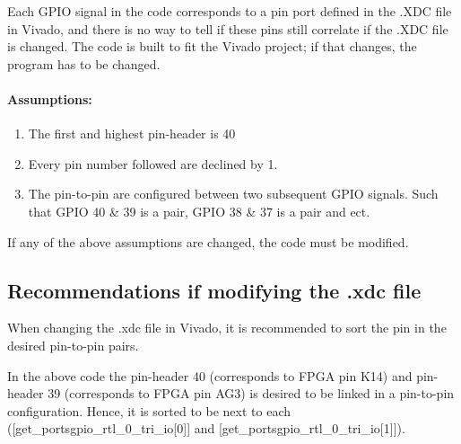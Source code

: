 \noindent Each GPIO signal in the code corresponds to a pin port defined in the .XDC file in Vivado, and there is no way to tell if these pins still correlate if the .XDC file is changed. The code is built to fit the Vivado project; if that changes, the program has to be changed. 

\vspace{-0.3 cm}
\paragraph{Assumptions:}
\begin{enumerate}
\vspace{-0.1 cm}
    \item The first and highest pin-header is 40
    \vspace{-0.3 cm}
    \item Every pin number followed are declined by 1.  
    \vspace{-0.3 cm}
    \item The pin-to-pin are configured between two subsequent GPIO signals. Such that GPIO 40 \& 39 is a pair, GPIO 38 \& 37 is a pair and ect.  
\end{enumerate}

\noindent If any of the above assumptions are changed, the code must be modified.

\subsection*{Recommendations if modifying the .xdc file}

\noindent When changing the .xdc file in Vivado, it is recommended to sort the pin in the desired pin-to-pin pairs.  

\noindent In the above code the pin-header 40 (corresponds to FPGA pin K14) and pin-header 39 (corresponds to FPGA pin AG3) is desired to be linked in a pin-to-pin configuration. Hence, it is sorted to be next to each ([get\_ports{gpio\_rtl\_0\_tri\_io[0]}] and [get\_ports{gpio\_rtl\_0\_tri\_io[1]}]). 

